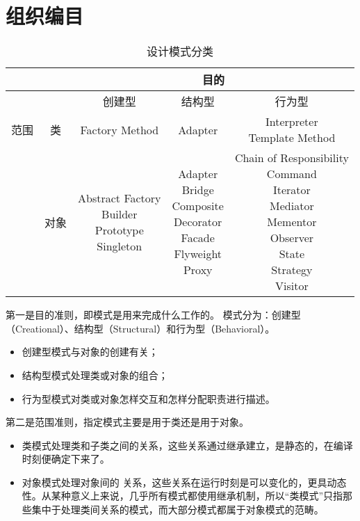 \section{组织编目}
\begin{table}[!h]
	\centering
	\begin{tabular}{|c|c|c|c|c|}
		\hline
		\multicolumn{2}{|c|}{}&\multicolumn{3}{|c|}{目的}\\
		\hline
		\multicolumn{2}{|c|}{}&创建型&结构型&行为型\\
		\hline
		范围&类&Factory Method&Adapter&\tabincell{l}{Interpreter\\Template Method}\\
		\hline
		&对象&\tabincell{l}{Abstract Factory\\Builder\\Prototype\\Singleton}
		&\tabincell{l}{Adapter\\Bridge\\Composite\\Decorator\\Facade\\Flyweight\\Proxy}
		&\tabincell{l}{Chain of Responsibility\\Command\\Iterator\\Mediator\\Mementor
		\\Observer\\State\\Strategy\\Visitor}\\
		\hline
	\end{tabular}
	\caption{设计模式分类}
\end{table}
第一是目的准则，即模式是用来完成什么工作的。
模式分为：创建型（Creational）、结构型（Structural）和行为型（Behavioral）。
\begin{itemize}
	\item 创建型模式与对象的创建有关；
	\item 结构型模式处理类或对象的组合；
	\item 行为型模式对类或对象怎样交互和怎样分配职责进行描述。
\end{itemize}
第二是范围准则，指定模式主要是用于类还是用于对象。
\begin{itemize}
	\item 类模式处理类和子类之间的关系，这些关系通过继承建立，是静态的，在编译时刻便确定下来了。
	\item 对象模式处理对象间的
	关系，这些关系在运行时刻是可以变化的，更具动态性。从某种意义上来说，几乎所有模式都使用继承机制，所以“类模式”只指那些集中于处理类间关系的模式，而大部分模式都属于对象模式的范畴。
\end{itemize}
